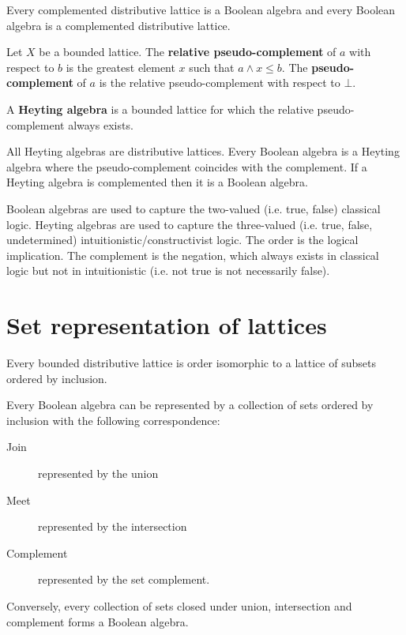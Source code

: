 \documentclass{bareminimum}
\begin{document}
\begin{prop}
	Every complemented distributive lattice is a Boolean algebra and every Boolean algebra is a complemented distributive lattice.
\end{prop}

\begin{defn}
	Let $X$ be  a bounded lattice. The \textbf{relative pseudo-complement} of $a$ with respect to $b$ is the greatest element $x$ such that $a \wedge x \leq b$. The \textbf{pseudo-complement} of $a$ is the relative pseudo-complement with respect to $\bot$.
\end{defn}

\begin{defn}
	A \textbf{Heyting algebra}  is a bounded lattice for which the relative pseudo-complement always exists.
\end{defn}

\begin{prop}
	All Heyting algebras are distributive lattices. Every Boolean algebra is a Heyting algebra where the pseudo-complement coincides with the complement. If a Heyting algebra is complemented then it is a Boolean algebra.
\end{prop}

\begin{remark}
	Boolean algebras are used to capture the two-valued (i.e. true, false) classical logic. Heyting algebras are used to capture the three-valued (i.e. true, false, undetermined) intuitionistic/constructivist logic. The order is the logical implication. The complement is the negation, which always exists in classical logic but not in intuitionistic (i.e. not true is not necessarily false).
\end{remark}

\section{Set representation of lattices}

\begin{prop}
	Every bounded distributive lattice is order isomorphic to a lattice of subsets ordered by inclusion.
\end{prop}

\begin{prop}
	Every Boolean algebra can be represented by a collection of sets ordered by inclusion with the following correspondence:
	\begin{description}
		\item[Join] represented by the union
		\item[Meet] represented by the intersection
		\item[Complement] represented by the set complement.
	\end{description}
	Conversely, every collection of sets closed under union, intersection and complement forms a Boolean algebra.
\end{prop}
\end{document}

